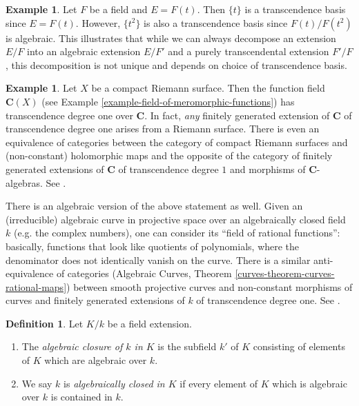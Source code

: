 \documentclass{stacks-project}
\theoremstyle{plain}
\theoremstyle{definition}
\newtheorem{definition}[subsection]{Definition}
\newtheorem{example}[subsection]{Example}
\theoremstyle{remark}
\numberwithin{equation}{subsection}
\begin{document}
\begin{example}
\label{example-function-field-not-unique-transcendence-basis}
Let $F$ be a field and $E = F(t)$. Then $\{t\}$ is a
transcendence basis since $E = F(t)$. However, $\{t^2\}$
is also a transcendence basis since $F(t)/F(t^2)$ is algebraic.
This illustrates that while we can always decompose an extension
$E/F$ into an algebraic extension $E/F'$ and a
purely transcendental extension $F'/F$, this decomposition is not unique and
depends on choice of transcendence basis.
\end{example}

\begin{example}
\label{example-riemann-surface-transcendence}
Let $X$ be a compact Riemann surface. Then the function field
$\mathbf{C}(X)$ (see Example \ref{example-field-of-meromorphic-functions})
has transcendence degree one over $\mathbf{C}$. In fact, {\it any}
finitely generated extension of $\mathbf{C}$ of transcendence degree
one arises from a Riemann surface. There is even an equivalence of
categories between the category of compact Riemann surfaces and
(non-constant) holomorphic maps and the opposite of the category of finitely
generated extensions of $\mathbf{C}$ of transcendence degree $1$
and morphisms of $\mathbf{C}$-algebras. See \cite{Forster}.

\medskip\noindent
There is an algebraic version of the above statement as well. Given an
(irreducible) algebraic curve in projective space over an algebraically
closed field $k$ (e.g. the complex numbers), one can consider its
``field of rational functions'': basically, functions that look like
quotients of polynomials, where the denominator does not identically
vanish on the curve. There is a similar anti-equivalence of categories
(Algebraic Curves, Theorem \ref{curves-theorem-curves-rational-maps})
between smooth projective curves and
non-constant morphisms of curves and finitely generated extensions of $k$ of
transcendence degree one. See \cite{H}.
\end{example}

\begin{definition}
\label{definition-algebraically-closed-in}
Let $K/k$ be a field extension.
\begin{enumerate}
\item The {\it algebraic closure of $k$ in $K$} is the subfield
$k'$ of $K$ consisting of elements of $K$ which are algebraic over $k$.
\item We say $k$ is {\it algebraically closed in $K$} if
every element of $K$ which is algebraic over $k$ is
contained in $k$.
\end{enumerate}
\end{definition}
\end{document}
